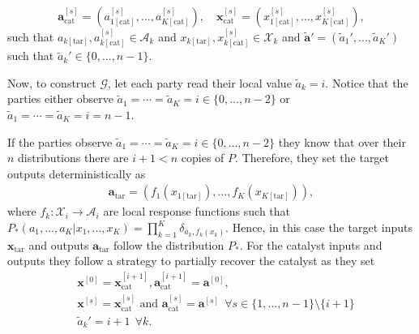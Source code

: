 \documentclass[pra,aps,reprint,superscriptaddress]{revtex4-2}
\theoremstyle{theorem}
\begin{document}
\begin{equation}
\mathbf{a}^{[s]}_{\mathrm{cat}} = (a^{[s]}_{1[\mathrm{cat}]},...,a^{[s]}_{K[\mathrm{cat}]}),
\quad
\mathbf{x}^{[s]}_{\mathrm{cat}} = (x^{[s]}_{1[\mathrm{cat}]},...,x^{[s]}_{K[\mathrm{cat}]}),
\end{equation}
such that $a_{k[\mathrm{tar}]},a^{[s]}_{k[\mathrm{cat}]}\in \mathcal{A}_k$ and $x_{k[\mathrm{tar}]},x^{[s]}_{k[\mathrm{cat}]}\in \mathcal{X}_k$ and $\mathbf{\tilde a}'=(\tilde a_{1}',...,\tilde a_{K}')$ such that $\tilde a_{k}'\in\{0,...,n-1\}$. 

Now, to construct $\mathcal{G}$, let each party read their local value $\tilde a_k = i$. Notice that the parties either observe $\tilde a_1=\cdots=\tilde a_K=i\in\{0,\ldots,n-2\}$ or $\tilde a_1=\cdots=\tilde a_K=i=n-1$. 

If the parties observe $\tilde a_1=\cdots=\tilde a_K=i\in\{0,\ldots,n-2\}$ they know that over their $n$ distributions there are $i+1<n$ copies of $P$. Therefore, they set the target outputs deterministically as
\begin{align}
\mathbf{a}_{\mathrm{tar}}=\left(f_1\left(x_{1[\mathrm{tar}]}\right),...,f_K\left(x_{K[\mathrm{tar}]}\right)\right),
\end{align}
where $f_k:\mathcal{X}_i \rightarrow \mathcal{A}_i$ are local response functions such that $P_*(a_1,...,a_K|x_1,...,x_K)=\prod_{k=1}^{K}\delta_{a_k,f_k(x_k)}$. Hence, in this case the target inputs $\mathbf{x}_{\mathrm{tar}}$ and outputs $\mathbf{a}_{\mathrm{tar}}$ follow the distribution $P_*$. For the catalyst inputs and outputs they follow a strategy to partially recover the catalyst as they set
\begin{align}\nonumber
&\mathbf{x}^{[0]}=\mathbf{x}_{\mathrm{cat}}^{[i+1]},\mathbf{a}_{\mathrm{cat}}^{[i+1]}=\mathbf{a}^{[0]},\\\nonumber& \mathbf{x}^{[s]}=\mathbf{x}_{\mathrm{cat}}^{[s]}\text{ and }\mathbf{a}_{\mathrm{cat}}^{[s]}=\mathbf{a}^{[s]}\ \ \forall s\in\{1,\ldots,n-1\}\setminus\{i+1\} \\&\tilde a_k'=i+1\ \ \forall k.
\label{B1}
\end{align}
\end{document}

